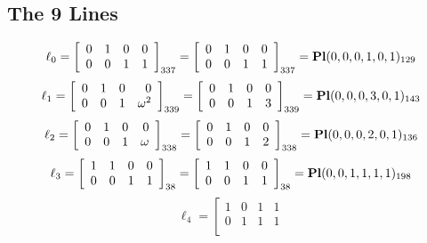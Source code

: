 \documentclass{article}
\begin{document}
{\subsection*{The 9 Lines}
$$
\ell_{0} = 
\left[
\begin{array}{*{4}{r}}
0 & 1 & 0 & 0\\
0 & 0 & 1 & 1\\
\end{array}
\right]
_{337}
=
\left[
\begin{array}{*{4}c}
0  & 1  & 0  & 0\\
0  & 0  & 1  & 1\\
\end{array}
\right]_{337}
={\rm\bf Pl}(0,0,0,1,0,1 )_{129}$$
$$
\ell_{1} = 
\left[
\begin{array}{*{4}{r}}
0 & 1 & 0 & 0\\
0 & 0 & 1 & \omega^{2}\\
\end{array}
\right]
_{339}
=
\left[
\begin{array}{*{4}c}
0  & 1  & 0  & 0\\
0  & 0  & 1  & 3\\
\end{array}
\right]_{339}
={\rm\bf Pl}(0,0,0,3,0,1 )_{143}$$
$$
\ell_{2} = 
\left[
\begin{array}{*{4}{r}}
0 & 1 & 0 & 0\\
0 & 0 & 1 & \omega \\
\end{array}
\right]
_{338}
=
\left[
\begin{array}{*{4}c}
0  & 1  & 0  & 0\\
0  & 0  & 1  & 2\\
\end{array}
\right]_{338}
={\rm\bf Pl}(0,0,0,2,0,1 )_{136}$$
$$
\ell_{3} = 
\left[
\begin{array}{*{4}{r}}
1 & 1 & 0 & 0\\
0 & 0 & 1 & 1\\
\end{array}
\right]
_{38}
=
\left[
\begin{array}{*{4}c}
1  & 1  & 0  & 0\\
0  & 0  & 1  & 1\\
\end{array}
\right]_{38}
={\rm\bf Pl}(0,0,1,1,1,1 )_{198}$$
$$
\ell_{4} = 
\left[
\begin{array}{*{4}{r}}
1 & 0 & 1 & 1\\
0 & 1 & 1 & 1\\

\end{array}$$}
\end{document}
